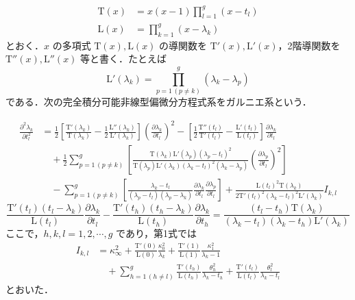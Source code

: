 \begin{story}
\begin{align}
\mathrm{T}(x) &= x(x-1) \prod_{l=1}^g (x-t_l) \label{eq:3.69} \\
\mathrm{L}(x) &= \prod_{k=1}^g (x-\lambda_k) \label{eq:3.70}
\end{align}
とおく．$x$ の多項式 $\mathrm{T}(x), \mathrm{L}(x)$ の導関数を $\mathrm{T}'(x), \mathrm{L}'(x)$，2階導関数を $\mathrm{T}''(x), \mathrm{L}''(x)$ 等と書く．たとえば
\begin{equation*}
\mathrm{L}'(\lambda_k) = \prod_{p=1 \, (p \neq k)}^g (\lambda_k - \lambda_p)
\end{equation*}
である．次の完全積分可能非線型偏微分方程式系をガルニエ系という．

\begin{definition}
\begin{align}
\frac{\partial^2 \lambda_k}{\partial t_l^2} &= \frac{1}{2} \left[ \frac{\mathrm{T}'(\lambda_k)}{\mathrm{T}(\lambda_k)} - \frac{1}{2} \frac{\mathrm{L}''(\lambda_k)}{\mathrm{L}'(\lambda_k)} \right] \left( \frac{\partial \lambda_k}{\partial t_l} \right)^2 - \left[ \frac{1}{2} \frac{\mathrm{T}''(t_l)}{\mathrm{T}'(t_l)} - \frac{\mathrm{L}'(t_l)}{\mathrm{L}(t_l)} \right] \frac{\partial \lambda_k}{\partial t_l} \nonumber \\
&\quad + \frac{1}{2} \sum_{p=1 \, (p \neq k)}^g \left[ \frac{\mathrm{T}(\lambda_k)\mathrm{L}'(\lambda_p)(\lambda_p - t_l)^2}{\mathrm{T}(\lambda_p)\mathrm{L}'(\lambda_k)(\lambda_k - t_l)^2(\lambda_k - \lambda_p)} \left( \frac{\partial \lambda_p}{\partial t_l} \right)^2 \right] \nonumber \\
&\quad - \sum_{p=1 \, (p \neq k)}^g \left[ \frac{\lambda_k - t_l}{(\lambda_p - t_l)(\lambda_p - \lambda_k)} \frac{\partial \lambda_k}{\partial t_l} \frac{\partial \lambda_p}{\partial t_l} \right] + \frac{\mathrm{L}(t_l)^2 \mathrm{T}(\lambda_k)}{2\mathrm{T}'(t_l)^2(\lambda_k - t_l)^2 \mathrm{L}'(\lambda_k)} I_{k,l} \label{eq:Garnier1}
\end{align}
\begin{equation}
\frac{\mathrm{T}'(t_l)(t_l - \lambda_k)}{\mathrm{L}(t_l)} \frac{\partial \lambda_k}{\partial t_l} - \frac{\mathrm{T}'(t_h)(t_h - \lambda_k)}{\mathrm{L}(t_h)} \frac{\partial \lambda_k}{\partial t_h} = \frac{(t_l - t_h)\mathrm{T}(\lambda_k)}{(\lambda_k - t_l)(\lambda_k - t_h)\mathrm{L}'(\lambda_k)} \label{eq:Garnier2}
\end{equation}
ここで，$h, k, l = 1, 2, \cdots, g$ であり，第1式では
\begin{align}
I_{k,l} &= \kappa_\infty^2 + \frac{\mathrm{T}'(0)}{\mathrm{L}(0)}\frac{\kappa_0^2}{\lambda_k} + \frac{\mathrm{T}'(1)}{\mathrm{L}(1)}\frac{\kappa_1^2}{\lambda_k - 1} \nonumber \\
&\quad + \sum_{h=1 \, (h \neq l)}^g \frac{\mathrm{T}'(t_h)}{\mathrm{L}(t_h)}\frac{\theta_h^2}{\lambda_k - t_h} + \frac{\mathrm{T}'(t_l)}{\mathrm{L}(t_l)}\frac{\theta_l^2}{\lambda_k - t_l} \label{eq:Garnier_I}
\end{align}
とおいた．
\end{definition}


\end{story}
